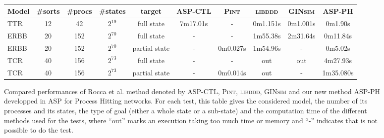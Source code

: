 \begin{figure}[htp]
\begin{center}
\label{tab:reachability}
\noindent%
\begin{tabular}{|l|c|c|c|c||c|c|c|c|c|}
  \hline
   Model&  \#sorts &\#procs & \#states & target & \textsc{ASP-CTL} & \textsc{Pint} & \textsc{libddd} & \textsc{GINsim} & \textsc{ASP-PH} \\
  \hline
  TTR & 12 &42 & $2^{19}$ & full state & 7m17.01s & - & 0m1.151s &  0m1.001s & 0m1.90s \\
  \hline
  ERBB & 20 &152 & $2^{70}$ & full state & - & - &1m55.38s & 2m31.64s & 0m11.84s \\
  \hline
  ERBB & 20 &152 & $2^{70}$ & partial state & - & 0m0.027s &1m54.96s & - & 0m5.02s \\
  \hline
  TCR & 40 &156 & $2^{73}$ & full state & - & - & out & out & 4m27.93s \\
  \hline
   TCR & 40 &156 & $2^{73}$ & partial state & - & 0m0.014s & out & - & 1m35.080s \\
  \hline
\end{tabular}
\caption{Compared performances of Rocca et al. method denoted by \textsc{ASP-CTL}, \textsc{Pint}, \textsc{libddd}, \textsc{GINsim} and our new method \textsc{ASP-PH} developped in ASP for Process Hitting networks.
For each test, this table gives the considered model,
the number of its processes and its states, the type of goal
(either a whole state or a sub-state)
and the computation time of the different methods used for the tests,
where “out” marks an execution taking too much time or memory
and “-” indicates that is not possible to do the test.
}
\end{center}
\end{figure}


 


